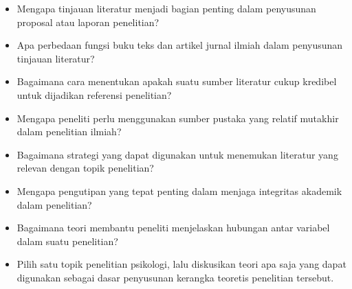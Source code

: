 \documentclass[
  indonesian,
  letterpaper,
  DIV=11,
  numbers=noendperiod]{scrreprt}
\providecommand{\tightlist}{%
  \setlength{\itemsep}{0pt}\setlength{\parskip}{0pt}}
\begin{document}
\begin{tcolorbox}[enhanced jigsaw, colframe=quarto-callout-important-color-frame, toptitle=1mm, breakable, leftrule=.75mm, arc=.35mm, toprule=.15mm, colback=white, colbacktitle=quarto-callout-important-color!10!white, bottomtitle=1mm, bottomrule=.15mm, titlerule=0mm, title=\textcolor{quarto-callout-important-color}{\faExclamation}\hspace{0.5em}{Refleksi \& DIskusi}, coltitle=black, left=2mm, opacitybacktitle=0.6, opacityback=0, rightrule=.15mm]

\begin{itemize}
\tightlist
\item
  Mengapa tinjauan literatur menjadi bagian penting dalam penyusunan
  proposal atau laporan penelitian?
\item
  Apa perbedaan fungsi buku teks dan artikel jurnal ilmiah dalam
  penyusunan tinjauan literatur?
\item
  Bagaimana cara menentukan apakah suatu sumber literatur cukup kredibel
  untuk dijadikan referensi penelitian?
\item
  Mengapa peneliti perlu menggunakan sumber pustaka yang relatif
  mutakhir dalam penelitian ilmiah?
\item
  Bagaimana strategi yang dapat digunakan untuk menemukan literatur yang
  relevan dengan topik penelitian?
\item
  Mengapa pengutipan yang tepat penting dalam menjaga integritas
  akademik dalam penelitian?
\item
  Bagaimana teori membantu peneliti menjelaskan hubungan antar variabel
  dalam suatu penelitian?
\item
  Pilih satu topik penelitian psikologi, lalu diskusikan teori apa saja
  yang dapat digunakan sebagai dasar penyusunan kerangka teoretis
  penelitian tersebut.
\end{itemize}

\end{tcolorbox}
\end{document}
